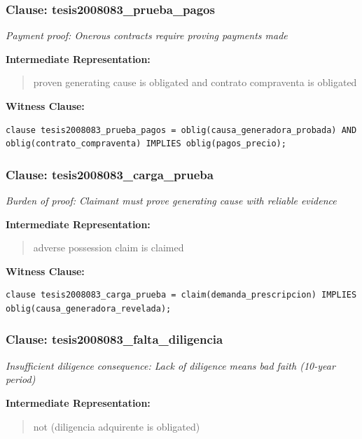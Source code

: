 \documentclass[11pt,a4paper]{article}
\begin{document}
\subsubsection{Clause: tesis2008083\_prueba\_pagos}

\textit{Payment proof: Onerous contracts require proving payments made}

\textbf{Intermediate Representation:}

\begin{quote}
proven generating cause is obligated and contrato compraventa is obligated
\end{quote}

\textbf{Witness Clause:}

\begin{lstlisting}[style=witnessstyle, language=Witness]
clause tesis2008083_prueba_pagos = oblig(causa_generadora_probada) AND oblig(contrato_compraventa) IMPLIES oblig(pagos_precio);
\end{lstlisting}

\subsubsection{Clause: tesis2008083\_carga\_prueba}

\textit{Burden of proof: Claimant must prove generating cause with reliable evidence}

\textbf{Intermediate Representation:}

\begin{quote}
adverse possession claim is claimed
\end{quote}

\textbf{Witness Clause:}

\begin{lstlisting}[style=witnessstyle, language=Witness]
clause tesis2008083_carga_prueba = claim(demanda_prescripcion) IMPLIES oblig(causa_generadora_revelada);
\end{lstlisting}

\subsubsection{Clause: tesis2008083\_falta\_diligencia}

\textit{Insufficient diligence consequence: Lack of diligence means bad faith (10-year period)}

\textbf{Intermediate Representation:}

\begin{quote}
not (diligencia adquirente is obligated)
\end{quote}
\end{document}
